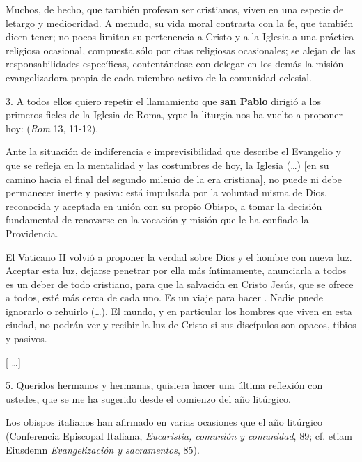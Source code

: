 \begin{body}
	Muchos, de hecho, que también profesan ser cristianos, viven en una especie de letargo y mediocridad. A menudo, su vida moral contrasta con la fe, que también dicen tener; no pocos limitan su pertenencia a Cristo y a la Iglesia a una práctica religiosa ocasional, compuesta sólo por citas religiosas ocasionales; se alejan de las responsabilidades específicas, contentándose con delegar en los demás la misión evangelizadora propia de cada miembro activo de la comunidad eclesial.

	3. A todos ellos quiero repetir el llamamiento que \textbf{san Pablo} dirigió a los primeros fieles de la Iglesia de Roma, y ​​que la liturgia nos ha vuelto a proponer hoy:  (\emph{Rom} 13, 11-12).

	Ante la situación de indiferencia e imprevisibilidad que describe el Evangelio y que se refleja en la mentalidad y las costumbres de hoy, la Iglesia (\ldots{}) {[}en su camino hacia el final del segundo milenio de la era cristiana{]}, no puede ni debe permanecer inerte y pasiva: está impulsada por la voluntad misma de Dios, reconocida y aceptada en unión con su propio Obispo, a tomar la decisión fundamental de renovarse en la vocación y misión que le ha confiado la Providencia.

	El Vaticano II volvió a proponer la verdad sobre Dios y el hombre con nueva luz. Aceptar esta luz, dejarse penetrar por ella más íntimamente, anunciarla a todos es un deber de todo cristiano, para que la salvación en Cristo Jesús, que se ofrece a todos, esté más cerca de cada uno. Es un viaje para hacer . Nadie puede ignorarlo o rehuirlo (\ldots{}). El mundo, y en particular los hombres que viven en esta ciudad, no podrán ver y recibir la luz de Cristo si sus discípulos son opacos, tibios y pasivos.

	{[} \ldots{}{]}

	5. Queridos hermanos y hermanas, quisiera hacer una última reflexión con ustedes, que se me ha sugerido desde el comienzo del año litúrgico.

	Los obispos italianos han afirmado en varias ocasiones que el año litúrgico  (Conferencia Episcopal Italiana, \emph{Eucaristía, comunión y comunidad}, 89; cf. etiam Eiusdemn \emph{Evangelización y sacramentos}, 85).


\end{body}
